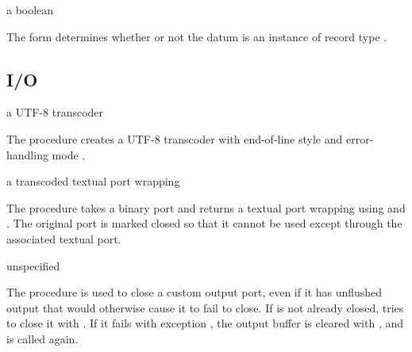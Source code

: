 \begin{syntax}
\end{syntax}
\returns{} a boolean

The  form determines whether or not the datum  is
an instance of record type .

\subsection {I/O}

\begin{procedure}
\end{procedure}
\returns{} a UTF-8 transcoder

The  procedure creates a UTF-8 transcoder
with end-of-line style  and error-handling mode
.

\begin{procedure}
\end{procedure}
\returns{} a transcoded textual port wrapping 

The  procedure takes a binary port  and
returns a textual port wrapping  using
 and . The
original port  is marked closed so that it cannot be used
except through the associated textual port.

\begin{procedure}
\end{procedure}
\returns{} unspecified

The  procedure is used to close a
custom output port, even if it has unflushed output that would
otherwise cause it to fail to close.  If  is not already
closed,  tries to close it with
. If it fails with exception
, the output
buffer is cleared with , and
 is called again.

